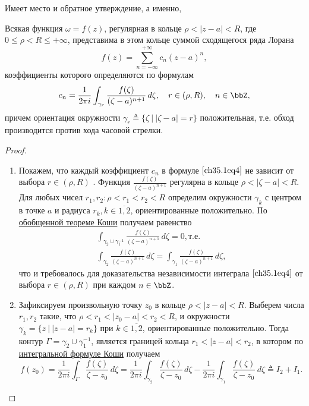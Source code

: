 Имеет место и обратное утверждение, а именно, 

\begin{leftbar}
\begin{thm} \label{ch35.1Thm1}
Всякая функция $\omega = f(z)$, регулярная в кольце $\rho < |z - a| < R$, где $0 \le \rho < R \le +\infty$, представима в этом кольце суммой сходящегося ряда Лорана
$$
f(z) = \sum\limits_{n = -\infty}^{+\infty} c_n(z - a)^n,
$$
коэффициенты которого определяются по формулам
\begin{equation} \label{ch35.1eq4}
c_n = \frac{1}{2\pi i} \int_{\gamma_r} \frac{f(\zeta)}{(\zeta - a)^{n + 1}} \,d\zeta, \quad r \in (\rho, R), \quad n \in \bbZ,
\end{equation}
причем ориентация окружности $\gamma_r \triangleq \{\zeta \: \big| \: |\zeta - a| = r\}$ положительная, т.е. обход производится против хода часовой стрелки.

\end{thm}

\begin{proof}


\begin{enumerate}
	
\item
Покажем, что каждый коэффициент $c_n$ в формуле $\eqref{ch35.1eq4}$ не зависит от выбора $r \in (\rho, R)$ . Функция $\frac{f(\zeta)}{(\zeta - a)^{n+1}}$ регулярна в кольце $\rho < |\zeta - a| < R$. Для любых чисел $r_1, r_2: \rho < r_1 < r_2 < R$ определим окружности $\gamma_k$ с центром в точке $a$ и радиуса $r_k, k \in \overline{1,2}$, ориентированные положительно. По \hyperref[abc28]{обобщенной теореме Коши} получаем равенство
\begin{equation*}
\begin{split}
\int_{\gamma_2 \cup \gamma_{1}^{-1}} \frac{f(\zeta)}{(\zeta - a)^{n + 1}} \,d\zeta = 0, \text{т.е.}\\
\int_{\gamma_2} \frac{f(\zeta)}{(\zeta - a)^{n + 1}} \,d\zeta = \int_{\gamma_1} \frac{f(\zeta)}{(\zeta - a)^{n + 1}} \,d\zeta,
\end{split}
\end{equation*}
что и требовалось для доказательства независимости интеграла $\eqref{ch35.1eq4}$ от выбора $r \in (\rho, R)$ при каждом $n \in \bbZ$.

\item

Зафиксируем произвольную точку $z_0$ в кольце $\rho < |z - a| < R$. Выберем числа $r_1, r_2$ такие, что 
$\rho < r_1 < |z_0 - a| < r_2 < R$, и окружности $\gamma_k = \{ z \: \big| \: |z - a| = r_k\}$ при $k \in \overline{1,2}$, ориентированные положительно. Тогда контур $\Gamma = \gamma_2 \cup \gamma_{1}^{-1}$, является границей кольца $r_1 < |z - a| < r_2$, в котором по  \hyperref[ch34thm1]{интегральной формуле Коши} получаем
\begin{equation} \label{ch35.1eq5}
f(z_0) = \frac{1}{2\pi i} \int_\Gamma \frac{f(\zeta)}{\zeta - z_0} \,d\zeta = \frac{1}{2\pi i} \int_{\gamma_2} \frac{f(\zeta)}{\zeta - z_0} \,d\zeta - \frac{1}{2\pi i} \int_{\gamma_1} \frac{f(\zeta)}{\zeta - z_0} \,d\zeta \triangleq I_2 + I_1.
\end{equation}


\end{enumerate}
\end{proof}
\end{leftbar}
